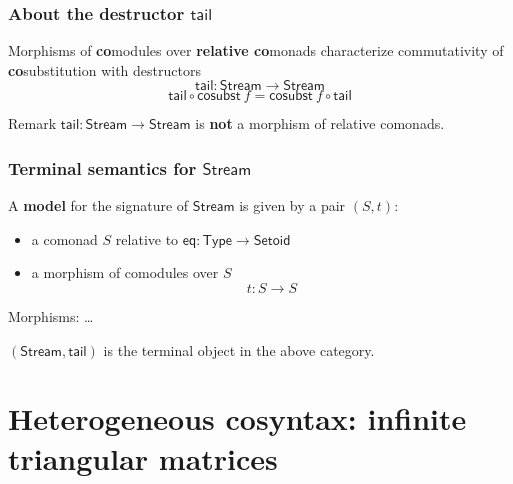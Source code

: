 \documentclass[
]
{beamer}
\newcommand{\constfont}[1]{\ensuremath{\mathsf{#1}}}
\newcommand{\stream}{\constfont{Stream}}
\newcommand{\stail}{\constfont{tail}}
\newcommand{\cosubst}{\constfont{cosubst}}
\newcommand{\comp}[2]{\ensuremath{{#2} \circ {#1}}}
\newcommand{\Setoid}{\constfont{Setoid}}
\newcommand{\eq}{\ensuremath{\mathsf{eq}}}
\newcommand{\Set}{\constfont{Type}}
\newcommand{\fat}[1]{\textbf{#1}}
\begin{document}
\begin{frame}
 \frametitle{About the destructor $\stail$}
 

 \begin{block}{Morphisms of \fat{co}modules over \fat{relative co}monads}
   characterize commutativity of \fat{co}substitution with destructors
         \[\stail : \stream \to \stream\]
          \[ \comp{\cosubst~f}{\stail} = \comp{\stail}{\cosubst~f} \]
 \end{block} 
 
 \begin{block}{Remark}
  $\stail: \stream\to\stream$ is \fat{not} a morphism of relative comonads.
 \end{block}

 
\end{frame}


\begin{frame}
 \frametitle{Terminal semantics for $\stream$}
 
  \begin{definition}
    A \fat{model} for the signature of $\stream$ is given by a pair $(S,t)$:
    \begin{itemize}
     \item a comonad $S$ relative to $\eq: \Set \to \Setoid$
     \item a morphism of comodules over $S$
        \[  t : S \to S \]
    \end{itemize}
   Morphisms: \ldots
  \end{definition}

 \begin{lemma}
  $(\stream,\stail)$ is the terminal object in the above category.
 \end{lemma}
  
\end{frame}


\section{Heterogeneous cosyntax: infinite triangular matrices}
\end{document}
